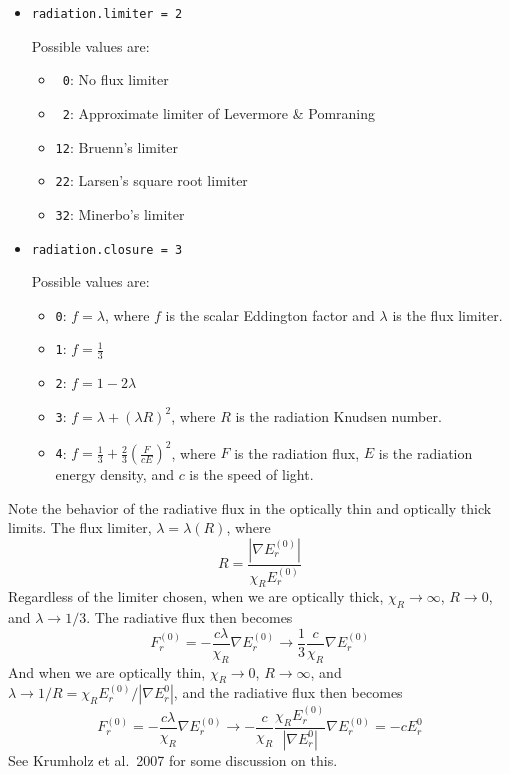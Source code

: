 \documentclass[11pt,letterpaper]{article}
\begin{document}
\begin{itemize}

\item {\tt radiation.limiter = 2}

  Possible values are:
  \begin{itemize}
  \item {\tt ~0}: No flux limiter

  \item {\tt ~2}: Approximate limiter of Levermore \& Pomraning

  \item {\tt 12}: Bruenn's limiter

  \item {\tt 22}: Larsen's square root limiter

  \item {\tt 32}: Minerbo's limiter
  \end{itemize}

\item {\tt radiation.closure = 3}

  Possible values are:
  \begin{itemize}
  \item {\tt 0}: $f = \lambda$, where $f$ is the scalar Eddington factor
    and $\lambda$ is the flux limiter.

  \item {\tt 1}: $f = \frac{1}{3}$
  \item {\tt 2}: $f = 1 - 2 \lambda$
  \item {\tt 3}: $f = \lambda + (\lambda R)^2$, where $R$ is the radiation
    Knudsen number.
  \item {\tt 4}: $f = \frac{1}{3} + \frac{2}{3} (\frac{F}{cE})^2$, where
      $F$ is the radiation flux, $E$ is the radiation energy density,
      and $c$ is the speed of light.
  \end{itemize}
\end{itemize}

Note the behavior of the radiative flux in the optically thin and
optically thick limits.  The flux limiter, $\lambda = \lambda(R)$,
where
\begin{equation}
  R = \frac{|\nabla E_r^{(0)}|}{\chi_R E_r^{(0)}}
\end{equation}
Regardless of the limiter chosen, when we are optically thick,
$\chi_R \rightarrow \infty$, $R \rightarrow 0$, and $\lambda \rightarrow 1/3$.
The radiative flux then becomes
\begin{equation}
  F_r^{(0)} = -\frac{c\lambda}{\chi_R} \nabla E_r^{(0)} \rightarrow
  \frac{1}{3} \frac{c}{\chi_R} \nabla E_r^{(0)}
\end{equation}
And when we are optically thin, $\chi_R \rightarrow 0$, $R \rightarrow \infty$,
and $\lambda \rightarrow 1/R = \chi_R E_r^{(0)}/{|\nabla E_r^{0}|}$, and
the radiative flux then becomes
\begin{equation}
  F_r^{(0)} = -\frac{c\lambda}{\chi_R} \nabla E_r^{(0)} \rightarrow
  -\frac{c}{\chi_R}\frac{\chi_R E_r^{(0)}}{|\nabla E_r^{0}|}
    \nabla E_r^{(0)} = -c E_r^{0}
\end{equation}
See Krumholz et al.\ 2007 for some discussion on this.
\end{document}
